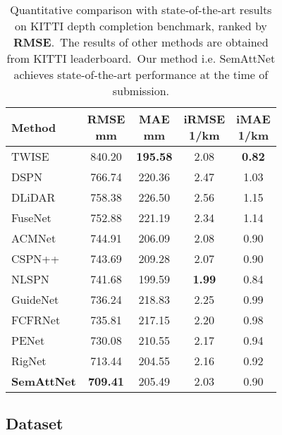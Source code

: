 \documentclass{ieeeaccess}
\begin{document}
\begin{table}


\begin{tabular}{l|cccc}
\hline
Method & \makecell{RMSE \\ mm} & \makecell{MAE \\ mm} & \makecell{iRMSE \\ 1/km} & \makecell{iMAE \\ 1/km}\\
\hline
TWISE \cite{imran2021depth} & 840.20 & \textbf{195.58} & 2.08 & \textbf{0.82}  \\
DSPN \cite{dspn} & 766.74 & 220.36 & 2.47 & 1.03  \\
DLiDAR \cite{Qiu_2019_CVPR} & 758.38 & 226.50 & 2.56 & 1.15  \\
FuseNet \cite{chen2019learning} & 752.88 & 221.19 & 2.34 & 1.14  \\
ACMNet \cite{zhao2021adaptive} & 744.91 & 206.09 & 2.08 & 0.90  \\
CSPN++ \cite{cheng2020cspn++} & 743.69 & 209.28 & 2.07 & 0.90  \\
NLSPN \cite{park2020non} & 741.68 & 199.59 & \textbf{1.99} & 0.84  \\
GuideNet \cite{tang2020learning} & 736.24 & 218.83 & 2.25 & 0.99  \\
FCFRNet \cite{liu2021fcfr} & 735.81 & 217.15 & 2.20 & 0.98  \\
PENet \cite{hu2020PENet} & 730.08 & 210.55 & 2.17 & 0.94  \\
RigNet \cite{yan2021rignet} & 713.44 & 204.55 & 2.16 & 0.92  \\
\hline
\textbf{SemAttNet} & \textbf{709.41} & 205.49 & 2.03 & 0.90  \\
\hline
\end{tabular}
\caption{Quantitative comparison with state-of-the-art results on KITTI depth completion benchmark, ranked by \textbf{RMSE}.~The results of other methods are obtained from KITTI leaderboard.~Our method i.e. SemAttNet achieves state-of-the-art performance at the time of submission.}
\label{table1}
\vspace{-11pt}
\end{table}
\subsection{Dataset}
\end{document}
